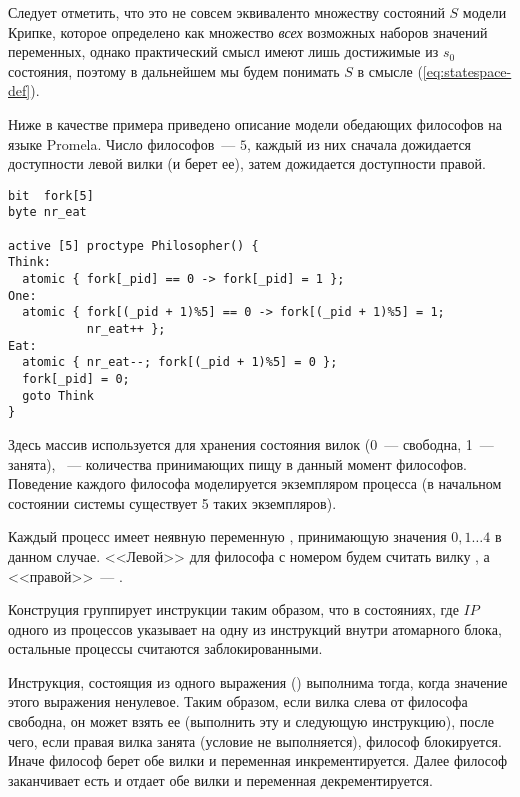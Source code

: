 Следует отметить, что это не совсем эквиваленто множеству состояний $S$ модели Крипке, которое
определено как множество \emph{всех} возможных наборов значений переменных, однако
практический смысл имеют лишь достижимые из $s_0$ состояния, поэтому в дальнейшем мы будем
понимать $S$ в смысле (\ref{eq:statespace-def}).

Ниже в качестве примера приведено описание модели обедающих философов на языке
Promela. Число философов~--- $5$, каждый из них сначала дожидается доступности левой вилки
(и берет ее), затем дожидается доступности правой.

\label{code:philo}

\begin{lstlisting}[float,language=Promela,style=simplecode,caption={Пример описания модели
    на языке Promela}]
bit  fork[5]
byte nr_eat

active [5] proctype Philosopher() {
Think:
  atomic { fork[_pid] == 0 -> fork[_pid] = 1 };
One:
  atomic { fork[(_pid + 1)%5] == 0 -> fork[(_pid + 1)%5] = 1; 
           nr_eat++ };
Eat:
  atomic { nr_eat--; fork[(_pid + 1)%5] = 0 };
  fork[_pid] = 0;
  goto Think
}  
\end{lstlisting}

Здесь массив  используется для хранения состояния вилок (0~--- свободна, 1~---
занята), ~--- количества принимающих пищу в данный момент
философов. Поведение каждого философа моделируется экземпляром процесса 
(в начальном состоянии системы существует 5 таких экземпляров). 

Каждый процесс имеет неявную переменную , принимающую значения $0, 1 \ldots 4$
в данном случае. <<Левой>> для философа с номером  будем считать вилку
, а <<правой>>~--- .

Конструция  группирует инструкции таким образом, что в состояниях, где $IP$
одного из процессов указывает на одну из инструкций внутри атомарного блока, остальные
процессы считаются заблокированными.

Инструкция, состоящия из одного выражения () выполнима тогда, когда
значение этого выражения ненулевое. Таким образом, если вилка слева от философа свободна,
он может взять ее (выполнить эту и следующую инструкцию), после чего, если правая вилка
занята (условие  не выполняется), философ
блокируется. Иначе философ берет обе вилки и переменная 
инкрементируется. Далее философ заканчивает есть и отдает обе вилки и переменная
 декрементируется.

